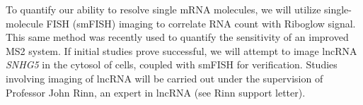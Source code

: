 To quantify our ability to resolve single mRNA molecules, we will utilize single-molecule FISH (smFISH) imaging to correlate RNA count with Riboglow signal\cite{MuellerFISHquantautomaticcounting2013}. This same method was recently used to quantify the sensitivity of an improved MS2 system\cite{TutucciimprovedMS2system2018}. If initial studies prove successful, we will attempt to image lncRNA \textit{SNHG5} in the cytosol of cells, coupled with smFISH for verification. Studies involving imaging of lncRNA will be carried out under the supervision of Professor John Rinn, an expert in lncRNA (see Rinn support letter).





